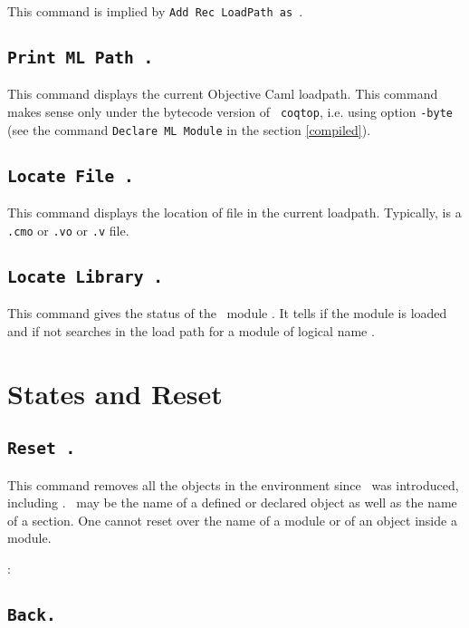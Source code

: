 \Rem This command is implied by {\tt Add Rec LoadPath {\str} as {\dirpath}}.

\subsection[\tt Print ML Path {\str}.]{\tt Print ML Path {\str}.}
This command displays the current Objective Caml loadpath.
This command makes sense only under the bytecode version of {\tt
coqtop}, i.e. using option {\tt -byte} (see the
command {\tt Declare ML Module} in the section
\ref{compiled}).

\subsection[\tt Locate File {\str}.]{\tt Locate File {\str}.\label{Locate File}}
This command displays the location of file {\str} in the current loadpath.
Typically, {\str} is a \texttt{.cmo} or \texttt{.vo} or \texttt{.v} file.

\subsection[\tt Locate Library {\dirpath}.]{\tt Locate Library {\dirpath}.\label{Locate Library}}
This command gives the status of the \Coq\ module {\dirpath}. It tells if the
module is loaded and if not searches in the load path for a module
of logical name {\dirpath}.

\section{States and Reset}

\subsection[\tt Reset \ident.]{\tt Reset \ident.}
This command removes all the objects in the environment since \ident\ 
was introduced, including \ident. \ident\ may be the name of a defined
or declared object as well as the name of a section.  One cannot reset
over the name of a module or of an object inside a module.

\begin{ErrMsgs}
\item \ident: 
\end{ErrMsgs}

\subsection[\tt Back.]{\tt Back.}

